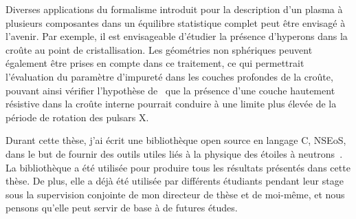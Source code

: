 Diverses applications du formalisme introduit pour la description d'un plasma à
plusieurs composantes dans un équilibre statistique complet peut être envisagé 
à l'avenir. 
Par exemple, il est envisageable d'étudier la présence d'hyperons dans la 
croûte au point de cristallisation. 
Les géométries non sphériques peuvent également être prises en compte dans ce
traitement, ce qui permettrait l'évaluation du paramètre d'impureté dans les 
couches profondes de la croûte, pouvant ainsi vérifier l'hypothèse 
de~\cite{Pons2013} que la présence d'une couche hautement résistive dans la 
croûte interne pourrait conduire à une limite plus élevée de la période de 
rotation des pulsars X.

Durant cette thèse, j'ai écrit une bibliothèque open source en langage C,
NSEoS, dans le but de fournir des outils utiles liés à la physique des étoiles 
à neutrons~\cite{NSEoS}. La bibliothèque a été utilisée pour produire tous les 
résultats présentés dans cette thèse.
De plus, elle a déjà été utilisée par différents étudiants pendant leur stage 
sous la supervision conjointe de mon directeur de thèse et de moi-même, et 
nous pensons qu'elle peut servir de base à de futures études.
